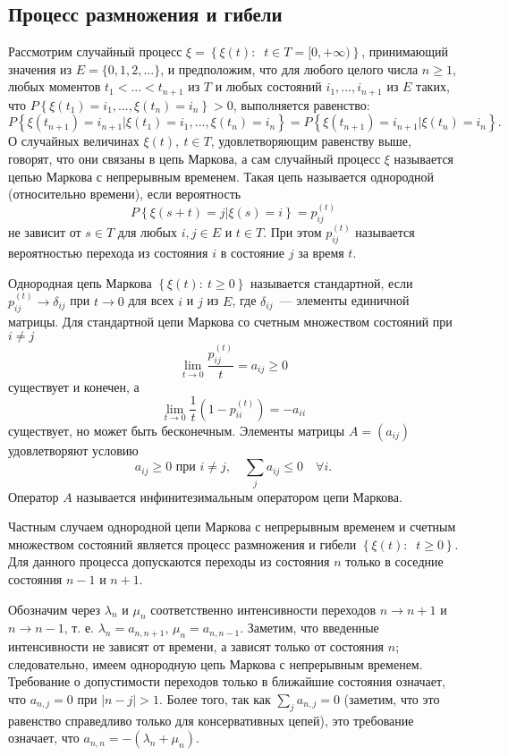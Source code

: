 \subsection{Процесс размножения и гибели}
\label{subsec:birth_and_death_process}

Рассмотрим случайный процесс $\xi=\left\{ {\xi (t):\;\;t \in T = [0, + \infty )} \right\}$, принимающий значения из $E = \{ 0,1,2,...\}$, и предположим, что для любого целого числа $n \ge 1$, любых моментов ${t_1} < ... < {t_{n + 1}}$ из $T$ и любых состояний ${i_1},...,{i_{n + 1}}$ из $E$ таких, что $P\left\{ {\xi ({t_1}) = {i_1},...,\xi ({t_n}) = {i_n}} \right\} > 0$, выполняется равенство:
\[P\left\{ {\xi ({t_{n + 1}}) = {i_{n + 1}}|\xi ({t_1}) = {i_1},...,\xi ({t_n}) = {i_n}} \right\} = P\left\{ {\xi ({t_{n + 1}}) = {i_{n + 1}}|\xi ({t_n}) = {i_n}} \right\} .\]
О случайных величинах $\xi (t),~t \in T$, удовлетворяющим равенству выше, говорят, что они связаны в цепь Маркова, а сам случайный процесс $\xi$ называется цепью Маркова с непрерывным временем. Такая цепь называется однородной (относительно времени), если вероятность
\[P\left\{ {\xi (s + t) = j|\xi (s) = i} \right\} = p_{ij}^{(t)}\]
не зависит от $s \in T$ для любых $i,j \in E$ и $t \in T$. При этом $p_{ij}^{(t)}$ называется вероятностью перехода из состояния $i$ в состояние $j$ за время $t$.

Однородная цепь Маркова $\left\{ {\xi (t):~t \ge 0} \right\}$ называется стандартной, если $p_{ij}^{(t)} \to {\delta _{ij}}$ при $t \to 0$ для всех $i$ и $j$ из $E$, где ${\delta _{ij}}$~--- элементы единичной матрицы. Для стандартной цепи Маркова со счетным множеством состояний при $i \ne j$
\[\mathop {\lim }\limits_{t \to 0} \frac{{p_{ij}^{(t)}}}{t} = {a_{ij}} \ge 0\]
существует и конечен, а
\[\mathop {\lim }\limits_{t \to 0} \frac{1}{t}\left( {1 - p_{ii}^{(t)}} \right) =  - {a_{ii}}\] 
существует, но может быть бесконечным. Элементы матрицы $A = \left( {{a_{ij}}} \right)$ удовлетворяют условию
\[{a_{ij}} \ge 0 \text{~при~} i \ne j, \quad \sum\limits_j {{a_{ij}}}  \le 0\quad \forall i .\]
Оператор $A$ называется инфинитезимальным оператором цепи Маркова.

Частным случаем однородной цепи Маркова с непрерывным временем и счетным множеством состояний является  процесс размножения и гибели $\left\{ {\xi (t):\;\;t \ge 0} \right\}$. Для данного процесса допускаются переходы из состояния $n$ только в соседние состояния $n - 1$ и $n + 1$.

Обозначим через ${\lambda _n}$ и ${\mu _n}$ соответственно интенсивности переходов $n \to n + 1$ и $n \to n - 1$, т. е. ${\lambda _n} = {a_{n,n + 1}}$, ${\mu _n} = {a_{n,n - 1}}$. Заметим, что введенные интенсивности не зависят от времени, а зависят только от состояния $n$; следовательно, имеем однородную цепь Маркова с непрерывным временем. Требование о допустимости переходов только в ближайшие состояния означает, что ${a_{n,j}} = 0$ при $\left| {n - j} \right| > 1$. Более того, так как $\sum\limits_j {{a_{n,j}}}  = 0$ (заметим, что это равенство справедливо только для консервативных цепей), это требование означает, что ${a_{n,n}} =  - \left( {{\lambda _n} + {\mu _n}} \right)$.

